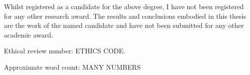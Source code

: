 \mbox{}
\vfill
{\Large \noindent Whilst registered as a candidate for the above degree, I have not been registered for any other research award. 
The results and conclusions embodied in this thesis are the work of the named candidate and have not been submitted for any other academic award.}
\vspace{1cm}
\par{\Large \noindent Ethical review number: ETHICS CODE.}
\par{\Large \noindent Approximate word count: MANY NUMBERS}
